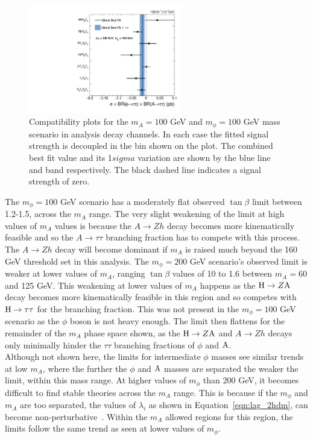 \begin{figure}[!hbtp]
\centering
    \includegraphics[width=0.6\textwidth]{Figures/ChannelCompatibilityCheck_FitResults_mphi100mA100_channel.pdf}
\caption{Compatibility plots for the $m_{A}=100$ GeV and $m_{\phi}=100$ GeV mass scenario in analysis decay channels. In each case the fitted signal strength is decoupled in the bin shown on the plot. The combined best fit value and its 1$sigma$ variation are shown by the blue line and band respectively. The black dashed line indicates a signal strength of zero.}
\label{fig:4tau_ccc}
\end{figure}

The $m_{\phi} = 100$ GeV scenario has a moderately flat observed $\tan\beta$ limit between 1.2-1.5, across the $m_{A}$ range.
The very slight weakening of the limit at high values of $m_{A}$ values is because the $A\rightarrow Zh$ decay becomes more kinematically feasible and so the $A\rightarrow\tau\tau$ branching fraction has to compete with this process.
The $A\rightarrow Zh$ decay will become dominant if $m_{A}$ is raised much beyond the 160 GeV threshold set in this analysis.
The $m_{\phi} = 200$ GeV scenario's observed limit is weaker at lower values of $m_{A}$, ranging $\tan\beta$ values of 10 to 1.6 between $m_{A} = 60$ and 125 GeV.
This weakening at lower values of $m_{A}$ happens as the ${\text{H}}\rightarrow Z{\text{A}}$ decay becomes more kinematically feasible in this region and so competes with ${\text{H}}\rightarrow\tau\tau$ for the branching fraction.
This was not present in the $m_{\phi}=100$ GeV scenario as the $\phi$ boson is not heavy enough.
The limit then flattens for the remainder of the $m_{A}$ phase space shown, as the ${\text{H}}\rightarrow Z{\text{A}}$ and $A\rightarrow Zh$ decays only minimally hinder the $\tau\tau$ branching fractions of $\phi$ and ${\text{A}}$. \\

Although not shown here, the limits for intermediate $\phi$ masses see similar trends at low $m_{A}$, where the further the $\phi$ and ${\text{A}}$ masses are separated the weaker the limit, within this mass range.
At higher values of $m_\phi$ than 200 GeV, it becomes difficult to find stable theories across the $m_{A}$ range. 
This is because if the $m_\phi$ and $m_{A}$ are too separated, the values of $\lambda_i$ as shown in Equation~\ref{eqn:lag_2hdm}, can become non-perturbative~\cite{Jueid:2021avn}.
Within the $m_{A}$ allowed regions for this region, the limits follow the same trend as seen at lower values of $m_{\phi}$. \\

